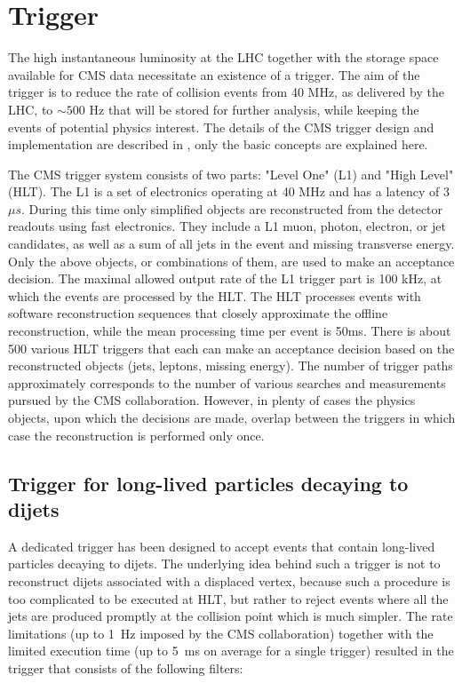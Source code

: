 \section{Trigger}

The high instantaneous luminosity at the LHC together with the storage space available for
CMS data necessitate an existence of a trigger.
 The aim of the trigger is to reduce the rate
of collision events from 40 MHz, as delivered by the LHC, to $\sim500$ Hz that will be stored
for further analysis, while keeping the events of potential physics interest.
The details of the CMS trigger design and implementation are described in \cite{Cittolin:578006},
only the basic concepts are explained here. 

The CMS trigger system consists of two parts: "Level One" (L1) and "High Level" (HLT).
The L1 is a set of electronics operating at 40 MHz and has a latency of 3~$\mu s$. During this
time only simplified 
objects are reconstructed from the detector readouts using fast electronics.
 They include a L1 muon, photon, 
electron, or jet candidates, as well as a sum of all jets in the event and missing transverse energy.
Only the above objects, or combinations of them, are used to make an acceptance decision. 
The maximal allowed output
rate of the L1 trigger part is 100 kHz, at which the events are processed by the HLT.
The HLT processes events with software reconstruction sequences that closely approximate
the offline reconstruction, while the mean processing time per event is 50ms. There is about 
500 various HLT triggers that each can make an acceptance decision based 
on the reconstructed objects
(jets, leptons, missing energy). The number of trigger paths approximately corresponds to the
number of various searches and measurements pursued by the CMS collaboration.
However, in plenty of cases the physics objects,
upon which the decisions are made, overlap between the triggers in which case the reconstruction 
is performed only once.


\subsection{Trigger for long-lived particles decaying to dijets}

A dedicated trigger has been designed to accept events that contain long-lived particles 
decaying to dijets. 
The underlying idea behind such a trigger is not to reconstruct dijets
associated with a displaced vertex, because such a procedure is too complicated to be executed 
at HLT, but rather to reject events where all the jets are produced promptly at the collision
point which is much simpler. The rate limitations (up to 1~Hz imposed by the CMS collaboration)
 together with the limited execution time (up to 5~ms on average for a single trigger)
resulted in the trigger that consists of the following filters:

